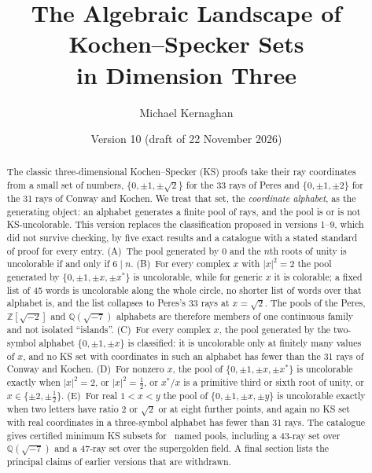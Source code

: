 \documentclass[11pt,a4paper]{article}
\title{The Algebraic Landscape of Kochen--Specker Sets\\in Dimension Three}
\author{Michael Kernaghan}
\date{Version 10 (draft of 22 November 2026)}
\theoremstyle{definition}
\theoremstyle{remark}
\newcommand{\Z}{\mathbb{Z}}
\newcommand{\Q}{\mathbb{Q}}
\begin{document}
\maketitle

\begin{abstract}
The classic three-dimensional Kochen--Specker (KS) proofs take their ray coordinates from a small
set of numbers, $\{0,\pm1,\pm\sqrt2\}$ for the 33 rays of Peres and $\{0,\pm1,\pm2\}$ for the 31
rays of Conway and Kochen.  We treat that set, the \emph{coordinate alphabet}, as the generating
object: an alphabet generates a finite pool of rays, and the pool is or is not KS-uncolorable.
This version replaces the classification proposed in versions 1--9, which did not survive
checking, by five exact results and a catalogue with a stated standard of proof for every entry.
(A)~The pool generated by $0$ and the $n$th roots of unity is uncolorable if and only if
$6\mid n$.  (B)~For every complex $x$ with $|x|^2=2$ the pool generated by
$\{0,\pm1,\pm x,\pm x^{*}\}$ is uncolorable, while for generic $x$ it is colorable; a fixed list of
45 words is uncolorable along the whole circle, no shorter list of words over that alphabet is,
and the list collapses to Peres's 33 rays at $x=\sqrt2$.  The pools of the Peres,
$\Z[\sqrt{-2}]$ and $\Q(\sqrt{-7})$ alphabets are therefore members of one continuous family and
not isolated ``islands''.  (C)~For every complex $x$, the pool generated by the two-symbol
alphabet $\{0,\pm1,\pm x\}$ is classified: it is uncolorable only at finitely many values of
$x$, and no KS set with coordinates in such an alphabet has fewer than the 31 rays of Conway and
Kochen.  (D)~For nonzero $x$, the pool of $\{0,\pm1,\pm x,\pm x^{*}\}$ is uncolorable exactly when $|x|^2=2$,
or $|x|^2=\tfrac12$, or $x^{*}/x$ is a primitive third or sixth root of unity, or
$x\in\{\pm2,\pm\tfrac12\}$.  (E)~For real $1<x<y$ the pool of $\{0,\pm1,\pm x,\pm y\}$ is
uncolorable exactly when two letters have ratio $2$ or $\sqrt2$ or at eight further points, and
again no KS set with real coordinates in a three-symbol alphabet has fewer than 31 rays.  The
catalogue gives certified minimum KS subsets for
\ncertified\ named pools, including a 43-ray set over $\Q(\sqrt{-7})$ and a 47-ray set over the
supergolden field.  A final section lists the principal claims of earlier versions that are
withdrawn.
\end{abstract}







\end{document}
